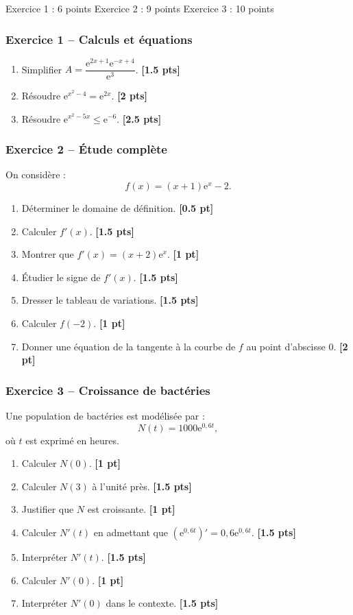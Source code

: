 \documentclass[11pt,a4paper]{article}
\newcommand{\e}{\mathrm{e}}
\newcommand{\pts}[1]{\hfill \textbf{[#1 pt]}}
\newcommand{\ptss}[1]{\hfill \textbf{[#1 pts]}}
\begin{document}
\begin{baremebox}
Exercice 1 : 6 points \quad
Exercice 2 : 9 points \quad
Exercice 3 : 10 points
\end{baremebox}

\subsubsection*{Exercice 1 -- Calculs et équations}

\begin{enumerate}
    \item Simplifier $A=\dfrac{\e^{2x+1}\e^{-x+4}}{\e^{3}}$. \ptss{1.5}
    \item Résoudre $\e^{x^2-4}=\e^{2x}$. \ptss{2}
    \item Résoudre $\e^{x^2-5x}\leq \e^{-6}$. \ptss{2.5}
\end{enumerate}

\subsubsection*{Exercice 2 -- Étude complète}

On considère :
\[
f(x)=(x+1)\e^x-2.
\]
\begin{enumerate}
    \item Déterminer le domaine de définition. \pts{0.5}
    \item Calculer $f'(x)$. \ptss{1.5}
    \item Montrer que $f'(x)=(x+2)\e^x$. \pts{1}
    \item Étudier le signe de $f'(x)$. \ptss{1.5}
    \item Dresser le tableau de variations. \ptss{1.5}
    \item Calculer $f(-2)$. \pts{1}
    \item Donner une équation de la tangente à la courbe de $f$ au point d'abscisse $0$. \pts{2}
\end{enumerate}

\subsubsection*{Exercice 3 -- Croissance de bactéries}

Une population de bactéries est modélisée par :
\[
N(t)=1000\e^{0,6t},
\]
où $t$ est exprimé en heures.
\begin{enumerate}
    \item Calculer $N(0)$. \pts{1}
    \item Calculer $N(3)$ à l'unité près. \ptss{1.5}
    \item Justifier que $N$ est croissante. \pts{1}
    \item Calculer $N'(t)$ en admettant que $(\e^{0,6t})'=0,6\e^{0,6t}$. \ptss{1.5}
    \item Interpréter $N'(t)$. \ptss{1.5}
    \item Calculer $N'(0)$. \pts{1}
    \item Interpréter $N'(0)$ dans le contexte. \ptss{1.5}
\end{enumerate}
\end{document}
